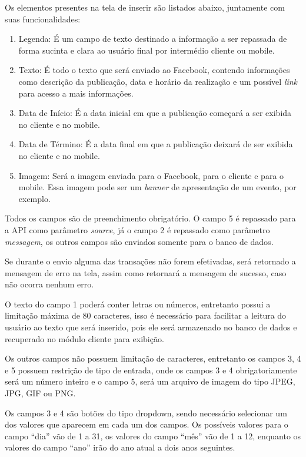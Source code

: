Os elementos presentes na tela de inserir são listados abaixo, juntamente com suas funcionalidades: 

\begin{enumerate}
   \item Legenda: É um campo de texto destinado a informação a ser repassada de forma sucinta e clara ao usuário final por intermédio cliente ou mobile. 
   \item Texto: É todo o texto que será enviado ao Facebook, contendo informações como descrição da publicação, data e horário da realização e um possível \textit{link} para acesso a mais informações. 
   \item Data de Início: É a data inicial em que a publicação começará a ser exibida no cliente e no mobile.
   \item Data de Término: É a data final em que a publicação deixará de ser exibida no cliente e no mobile.
   \item Imagem: Será a imagem enviada para o Facebook, para o cliente e para o mobile. Essa imagem pode ser um \textit{banner} de apresentação de um evento, por exemplo.
 \end{enumerate}

Todos os campos são de preenchimento obrigatório. O campo 5 é repassado para a API como parâmetro \textit{source}, já o campo 2 é repassado como parâmetro \textit{messagem}, os outros campos são enviados somente para o banco de dados.

Se durante o envio alguma das transações não forem efetivadas, será retornado a mensagem de erro na tela, assim como retornará a mensagem de sucesso, caso não ocorra nenhum erro.

O texto do campo 1 poderá conter letras ou números, entretanto possui a limitação máxima de 80 caracteres, isso é necessário para facilitar a leitura do usuário ao texto que será inserido, pois ele será armazenado no banco de dados e recuperado no módulo cliente para exibição.

Os outros campos não possuem limitação de caracteres, entretanto os campos 3, 4 e 5 possuem restrição de tipo de entrada, onde os campos 3 e 4 obrigatoriamente será um número inteiro e o campo 5, será um arquivo de imagem do tipo JPEG, JPG, GIF ou PNG.

Os campos 3 e 4 são botões do tipo dropdown, sendo necessário selecionar um dos valores que aparecem em cada um dos campos. Os possíveis valores para o campo ``dia'' vão de 1 a 31, os valores do campo ``mês'' vão de 1 a 12, enquanto os valores do campo ``ano'' irão do ano atual a dois anos seguintes.

